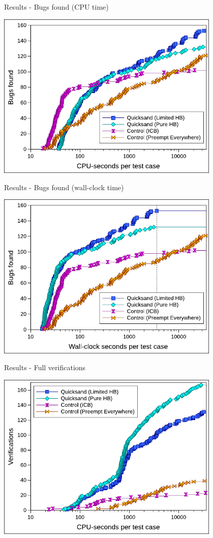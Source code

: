 \documentclass[xcolor=dvipsnames]{beamer}
\begin{document}
\begin{frame}{Results - Bugs found (CPU time)}
	\begin{center}
		\includegraphics[width=0.8\textwidth]{../../oopsla/bugs-talk.pdf}
	\end{center}
\end{frame}
\begin{frame}{Results - Bugs found (wall-clock time)}
	\begin{center}
		\includegraphics[width=0.8\textwidth]{../../oopsla/bugs-wallclock-talk.pdf}
	\end{center}
\end{frame}
\begin{frame}{Results - Full verifications}
	\begin{center}
		\includegraphics[width=0.8\textwidth]{../../oopsla/verifs-talk.pdf}
	\end{center}
\end{frame}
\end{document}
